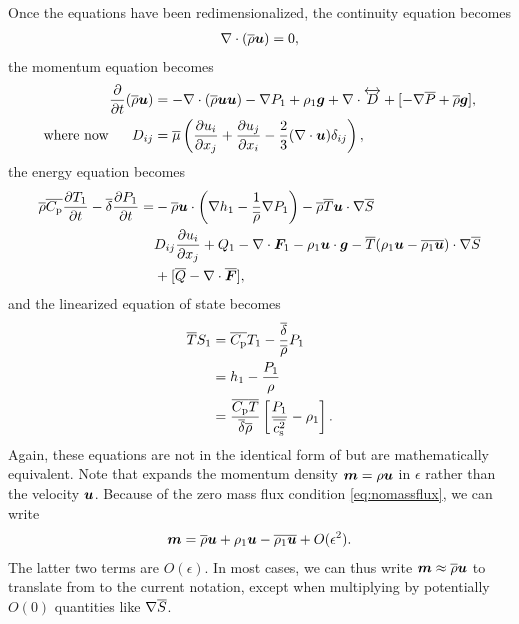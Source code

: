 \documentclass[12pt]{article}
\newcommand{\vecf}{\bm{F}}
\newcommand{\deltaref}{\overline{\delta}}
\newcommand{\cpref}{\overline{\cpcap}}
\newcommand{\cssqref}{\overline{\cs^2}}
\begin{document}
	Once the equations have been redimensionalized, the continuity equation becomes
	\begin{align}\label{eq:ancont}
		\nabla\cdot(\overline{\rho}\bm{u})= 0,
	\end{align}
	the momentum equation becomes 
	\begin{subequations}\label{eq:anmom}
	\begin{align}
		\frac{\partial}{\partial t}(\overline{\rho}\bm{u})&=-\nabla\cdot(\overline{\rho}\bm{u}\bm{u}) - \nabla P_1 +\rho_1\bm{g} +\nabla\cdot \overleftrightarrow{D}+[-\nabla\overline{P} + \overline{\rho}\bm{g}],\label{eq:anmommain}\\
		\text{where now}\ \ \ \ \  D_{ij}& = \overline{\mu}\left(\frac{\partial u_i}{\partial x_j} + \frac{\partial u_j}{\partial x_i} - \frac{2}{3}(\nabla\cdot\bm{u})\delta_{ij}\right)\label{eq:anmomvisc},
	\end{align}
	\end{subequations}
	the energy equation becomes 
	\begin{align}\label{eq:anen}
		\rhoref\cpref\pderiv{T_1}{t} - \deltaref\pderiv{P_1}{t} = &-\rhoref\vecu\cdot\left(\nabla h_1-\frac{1}{\rhoref}\nabla P_1\right) - \rhoref \tmpref \ugrad \sref\nonumber\\
		& D_{ij}\pderiv{u_i}{x_j} + Q _1- \Div\vecf_1 -\rho_1\vecu\cdot\vecg - \tmpref(\rho_1\vecu-\overline{\rho_1\vecu})\cdot\nabla\sref\nonumber\\
		&+ [\qref - \Div\overline{\vecf}],
	\end{align}
  and the linearized equation of state becomes
  \begin{subequations}\label{eq:aneos}
  \begin{align}
  	\tmpref S_1 &= \cpref T_1 - \frac{\deltaref}{\rhoref} P_1\\
  	&= h_1 - \frac{P_1}{\rho}\\
  	&= \frac{\cpref\tmpref}{\deltaref\rhoref}\left[\frac{P_1}{\cssqref}-\rho_1\right].
  \end{align}
  \end{subequations}
  Again, these equations are not in the identical form of \citet{Gough1969} but are mathematically equivalent. Note that \citet{Gough1969} expands the momentum density $\bm{m}=\rho\bm{u}$ in $\epsilon$ rather than the velocity $\bm{u}$. Because of the zero mass flux condition \eqref{eq:nomassflux}, we can write
  \begin{align}
  	\bm{m} = \overline{\rho}\bm{u} + \rho_1\bm{u} - \overline{\rho_1\bm{u}} + O(\epsilon^2).
  \end{align}
  The latter two terms are $O(\epsilon)$. In most cases, we can thus write $\bm{m} \approx \overline{\rho} \bm{u}$ to translate from \citet{Gough1969} to the current notation, except when multiplying by potentially $O(0)$ quantities like $\nabla\overline{S}$. 
  
\end{document}

